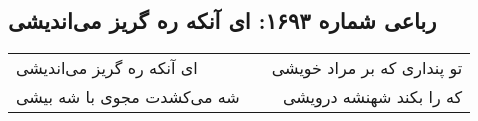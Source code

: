 \begin{center}
\section*{رباعی شماره ۱۶۹۳: ای آنکه ره گریز می‌اندیشی}
\label{sec:1693}
\begin{longtable}{l p{0.5cm} r}
ای آنکه ره گریز می‌اندیشی
&&
تو پنداری که بر مراد خویشی
\\
شه می‌کشدت مجوی با شه بیشی
&&
که را بکند شهنشه درویشی
\\
\end{longtable}
\end{center}
